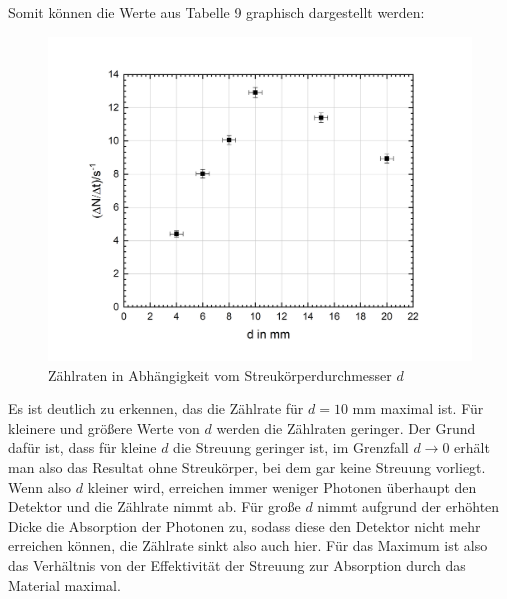 \documentclass[german,  %
parskip=full,  %
]{scrartcl}
\begin{document}
\\\\
Somit können die Werte aus Tabelle 9 graphisch dargestellt werden:
\newpage
\begin{figure}[h!]\centering
\includegraphics[scale=0.5]{durchmesser}
\caption{Zählraten in Abhängigkeit vom Streukörperdurchmesser $d$}
\end{figure}
Es ist deutlich zu erkennen, das die Zählrate für $d=10$ mm maximal ist. Für kleinere und größere Werte von $d$ werden die Zählraten geringer. Der Grund dafür ist, dass für kleine $d$ die Streuung geringer ist, im Grenzfall $d \rightarrow 0$ erhält man also das Resultat ohne Streukörper, bei dem gar keine Streuung vorliegt. Wenn also $d$ kleiner wird, erreichen immer weniger Photonen überhaupt den Detektor und die Zählrate nimmt ab. Für große $d$ nimmt aufgrund der erhöhten Dicke die Absorption der Photonen zu, sodass diese den Detektor nicht mehr erreichen können, die Zählrate sinkt also auch hier. Für das Maximum ist also das Verhältnis von der Effektivität der Streuung zur Absorption durch das Material maximal.
\end{document}
